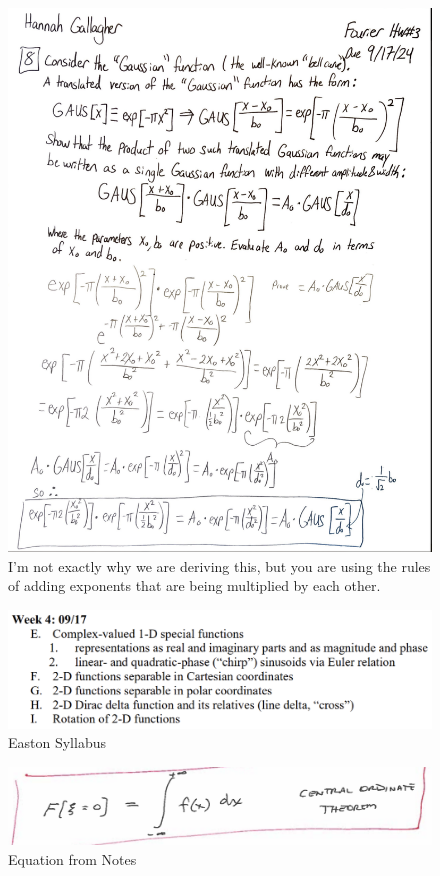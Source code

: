 \documentclass{article}
\begin{document}
\begin{figure}[h!]
\centering
\includegraphics[scale=.65]{Fourier/Week 3/HW/Gaussian.png}
\caption{I'm not exactly why we are deriving this, but you are using the rules of adding exponents that are being multiplied by each other.}
\label{fig:Snowman}
\end{figure}

\begin{figure}[h!]
\centering
\includegraphics[scale=.65]{Fourier/Week 4/Week4.1.png}
\caption{Easton Syllabus}
\label{fig:Snowman}
\end{figure}

\begin{figure}[h!]
\centering
\includegraphics[scale=.65]{Fourier/Week 4/Notes/Ordinate.png}
\caption{Equation from Notes}
\label{fig:Snowman}
\end{figure}
\end{document}
